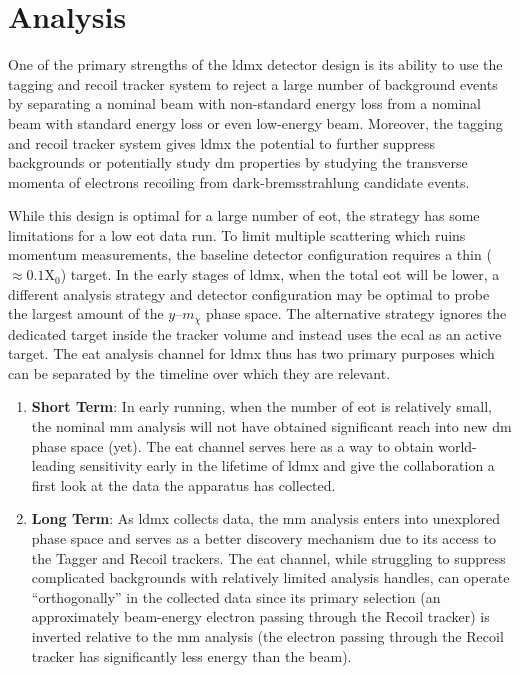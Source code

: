 \chapter{Analysis}
\label{chapter:ldmx:analysis}

One of the primary strengths of the \ac{ldmx} detector design is its ability to use the tagging and
recoil tracker system to reject a large number of background events by separating a nominal beam
with non-standard energy loss from a nominal beam with standard energy loss or even low-energy
beam. Moreover, the tagging and recoil tracker system gives \ac{ldmx} the potential to further
suppress backgrounds or potentially study \ac{dm} properties by studying the transverse momenta of
electrons recoiling from dark-bremsstrahlung candidate events.

While this design is optimal for a large number of \ac{eot}, the strategy has some limitations for
a low \ac{eot} data run. To limit multiple scattering which ruins momentum measurements, the
baseline detector configuration requires a thin ($\approx 0.1\mathrm{X}_0$) target. In the early
stages of \ac{ldmx}, when the total \ac{eot} will be lower, a different analysis strategy and
detector configuration may be optimal to probe the largest amount of the $y$--$m_\chi$ phase
space. The alternative
strategy ignores the dedicated target inside the tracker volume and instead uses the \ac{ecal}
as an active target. The \ac{eat} analysis channel for \ac{ldmx} thus has two primary purposes
which can be separated by the timeline over which they are relevant.
\begin{enumerate}
  \item \textbf{Short Term}: In early running, when the number of \ac{eot} is
        relatively small, the nominal \ac{mm} analysis will not have obtained
        significant reach into new \ac{dm} phase space (yet). The \ac{eat} channel
        serves here as a way to obtain world-leading sensitivity early in the lifetime
        of \ac{ldmx} and give the collaboration a first look at the data the apparatus
        has collected.
  \item \textbf{Long Term}: As \ac{ldmx} collects data, the \ac{mm}
        analysis enters into unexplored phase space and serves as a better discovery
        mechanism due to its access to the Tagger and Recoil trackers. The \ac{eat}
        channel, while struggling to suppress complicated backgrounds with relatively
        limited analysis handles, can operate ``orthogonally'' in the collected data
        since its primary selection (an approximately beam-energy electron passing
        through the Recoil tracker) is inverted relative to the \ac{mm} analysis
        (the electron passing through the Recoil tracker has significantly less
        energy than the beam).
\end{enumerate}

